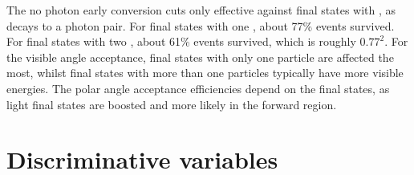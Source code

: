 The no photon early conversion cuts only effective against final states with \Ppizero, as \Ppizero decays to a photon pair. For final states with one \Ppizero, about 77\% events survived. For final states with two \Ppizero, about 61\% events survived, which is roughly $0.77^2$. For the visible angle acceptance, final states with only one particle are affected the most, whilst final states with more than one particles typically have more visible energies. The polar angle acceptance efficiencies depend on the final states, as light final states are boosted and more likely in the forward region.






\section{Discriminative variables}


